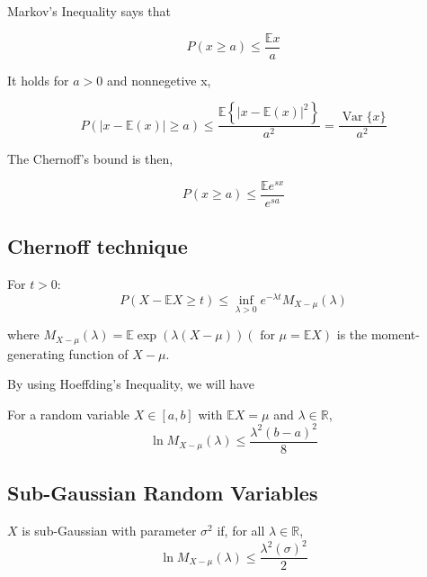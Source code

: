 Markov's Inequality says that

\begin{equation}
  P(x \geq a) \leq \frac{\mathbb{E}x}{a}
\end{equation}

It holds for $a >0$ and nonnegetive x, 

\begin{equation}
  P(|x-\mathbb{E}(x)| \geq a) \leq \frac{\mathbb{E}\left\{|x-\mathbb{E}(x)|^{2}\right\}}{a^{2}}=\frac{\operatorname{Var}\{x\}}{a^{2}}
\end{equation}

The Chernoff's bound is then,

\begin{equation}
  P(x \geq a) \leq \frac{\mathbb{E}e^{sx}}{e^{sa}}
\end{equation}

\subsection{Chernoff technique}

\begin{theorem} \cite*{Bartlett:2020}
  For $t>0$:
  \begin{equation}
    P(X-\mathbb{E} X \geq t) \leq \inf _{\lambda>0} e^{-\lambda t} M_{X-\mu}(\lambda)
  \end{equation}
\end{theorem}

where $M_{X-\mu}(\lambda)=\mathbb{E} \exp (\lambda(X-\mu))(\text { for } \mu=\mathbb{E} X)$
is the moment-generating function of $X-\mu$.

By using Hoeffding's Inequality, we will have 

\begin{theorem} \cite*{Bartlett:2020}
  For a random variable $X \in [a,b]$ with $\mathbb{E}X = \mu$ and $\lambda \in \mathbb{R}$,
  \begin{equation}
    \ln M_{X-\mu}(\lambda) \leq \frac{\lambda^{2}(b-a)^{2}}{8}
  \end{equation}
\end{theorem}

\subsection{Sub-Gaussian Random Variables}
\begin{definition} \cite*{Bartlett:2020}
  $X$ is sub-Gaussian with parameter $\sigma^2$ if, for all $\lambda \in \mathbb{R}$,
  \begin{equation}
    \ln M_{X-\mu}(\lambda) \leq \frac{\lambda^{2}(\sigma)^{2}}{2}
  \end{equation}
\end{definition}

